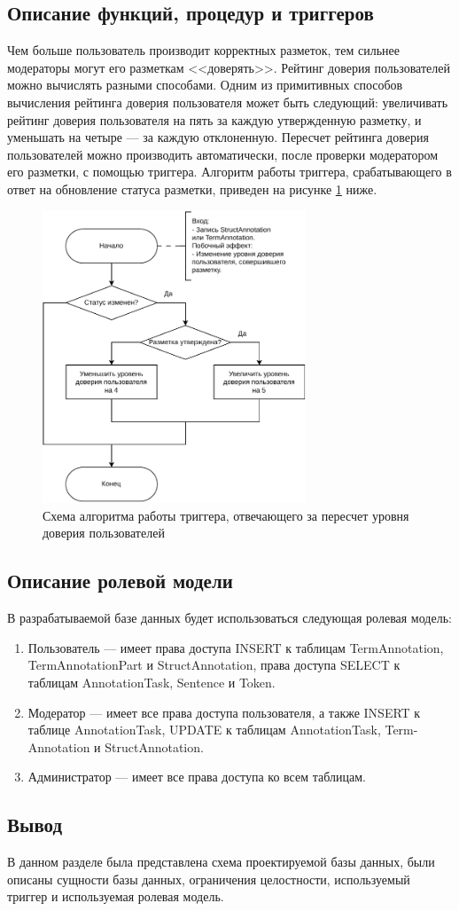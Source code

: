 \subsection{Описание функций, процедур и триггеров}

Чем больше пользователь производит корректных разметок, тем сильнее модераторы могут его разметкам <<доверять>>.
Рейтинг доверия пользователей можно вычислять разными способами.
Одним из примитивных способов вычисления рейтинга доверия пользователя может быть следующий: увеличивать рейтинг доверия пользователя на пять за каждую утвержденную разметку, и уменьшать на четыре --- за каждую отклоненную.
Пересчет рейтинга доверия пользователей можно производить автоматически, после проверки модератором его разметки, с помощью триггера.
Алгоритм работы триггера, срабатывающего в ответ на обновление статуса разметки, приведен на рисунке \ref{fig:trig} ниже.

\begin{figure}[H]
	\centering
	\includegraphics[width=0.7\textwidth]{diag/trig-v3.pdf}
	\caption{Схема алгоритма работы триггера, отвечающего за пересчет уровня доверия пользователей}
	\label{fig:trig}
\end{figure}

\subsection{Описание ролевой модели}

В разрабатываемой базе данных будет использоваться следующая ролевая модель:
\begin{enumerate}
    \item Пользователь --- имеет права доступа INSERT к таблицам TermAnnotation, TermAnnotationPart и StructAnnotation, права доступа SELECT к таблицам AnnotationTask, Sentence и Token.
    \item Модератор --- имеет все права доступа пользователя, а также INSERT к таблице AnnotationTask, UPDATE к таблицам AnnotationTask, Term-Annotation и StructAnnotation.
    \item Администратор --- имеет все права доступа ко всем таблицам.
\end{enumerate}

\subsection*{Вывод}

В данном разделе была представлена схема проектируемой базы данных, были описаны сущности базы данных, ограничения целостности, используемый триггер и используемая ролевая модель.
